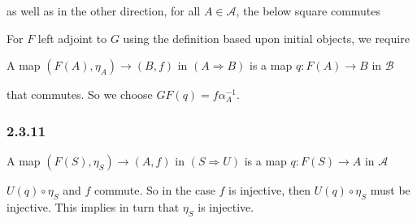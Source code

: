 \documentclass{article}
\begin{document}
\begin{center}
\end{center}

as well as in the other direction, for all $A \in \mathcal{A}$, the below square commutes

\begin{center}
\end{center}

For $F$ left adjoint to $G$ using the definition based upon initial objects, we require

A map $(F(A), \eta_A) \rightarrow (B,f)$ in $(A \Rightarrow B)$ is a map $q\colon F(A) \rightarrow B$ in $\mathcal{B}$
\begin{center}
\end{center}

that commutes. So we choose $GF(q) = f\alpha_A^{-1}$.

\subsubsection*{2.3.11}

A map $(F(S), \eta_S) \rightarrow (A,f)$ in $(S \Rightarrow U)$ is a map $q\colon F(S) \rightarrow A$ in $\mathcal{A}$

\begin{center}
\end{center}

$U(q) \circ \eta_S$ and $f$ commute. So in the case $f$ is injective, then $U(q) \circ \eta_S$ must be injective. This implies in turn that $\eta_S$ is injective.
\end{document}
